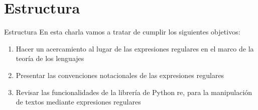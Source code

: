 \documentclass{beamer}
\begin{document}

\section{Estructura}
\begin{frame}{Estructura}
En esta charla vamos a tratar de cumplir los siguientes objetivos: 

\begin{enumerate}
\item Hacer un acercamiento al lugar de las expresiones regulares en el marco de la teoría de los lenguajes
\item Presentar las convenciones notacionales de las expresiones regulares
\item Revisar las funcionalidades de la librería de Python re, para la manipulación de textos mediante expresiones regulares
\end{enumerate}
\end{frame}
\end{document}
